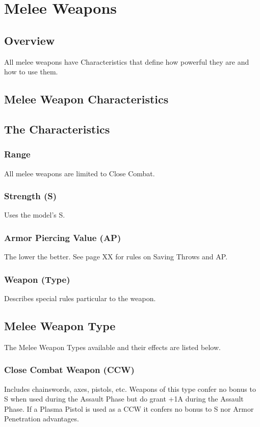 
\chapter{Melee Weapons}

\section{Overview}
All melee weapons have Characteristics that define how
powerful they are and how to use them.

\section{Melee Weapon Characteristics}


\section{The Characteristics}

\subsection{Range}

All melee weapons are limited to Close Combat.
\subsection{Strength (S)}

Uses the model’s S.
\subsection{Armor Piercing Value (AP)}

The lower the better. See page XX for rules on Saving Throws
and AP.
\subsection{Weapon (Type)}

Describes special rules particular to the weapon.

\section{Melee Weapon Type}
The Melee Weapon Types available and their effects are listed
below.


\subsection{Close Combat Weapon (CCW)}
Includes chainswords, axes, pistols, etc. Weapons of this type
confer no bonus to S when used during the Assault Phase but
do grant +1A during the Assault Phase. If a Plasma Pistol is
used as a CCW it confers no bonus to S nor Armor Penetration
advantages.

